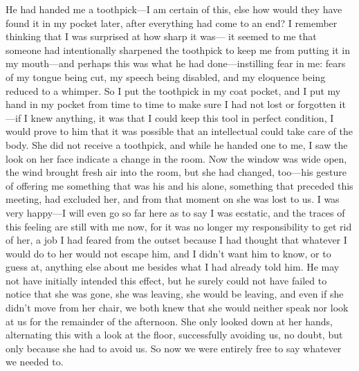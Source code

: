 \documentclass[
]{memoir}
\begin{document}
He had handed me a toothpick---I am certain of this, else how would they
have found it in my pocket later, after everything had come to an end? I
remember thinking that I was surprised at how sharp it was--- it seemed
to me that someone had intentionally sharpened the toothpick to keep me
from putting it in my mouth---and perhaps this was what he had
done---instilling fear in me: fears of my tongue being cut, my speech
being disabled, and my eloquence being reduced to a whimper. So I put
the toothpick in my coat pocket, and I put my hand in my pocket from
time to time to make sure I had not lost or forgotten it---if I knew
anything, it was that I could keep this tool in perfect condition, I
would prove to him that it was possible that an intellectual could take
care of the body. She did not receive a toothpick, and while he handed
one to me, I saw the look on her face indicate a change in the room. Now
the window was wide open, the wind brought fresh air into the room, but
she had changed, too---his gesture of offering me something that was his
and his alone, something that preceded this meeting, had excluded her,
and from that moment on she was lost to us. I was very happy---I will
even go so far here as to say I was ecstatic, and the traces of this
feeling are still with me now, for it was no longer my responsibility to
get rid of her, a job I had feared from the outset because I had thought
that whatever I would do to her would not escape him, and I didn't want
him to know, or to guess at, anything else about me besides what I had
already told him. He may not have initially intended this effect, but he
surely could not have failed to notice that she was gone, she was
leaving, she would be leaving, and even if she didn't move from her
chair, we both knew that she would neither speak nor look at us for the
remainder of the afternoon. She only looked down at her hands,
alternating this with a look at the floor, successfully avoiding us, no
doubt, but only because she had to avoid us. So now we were entirely
free to say whatever we needed to.
\end{document}
